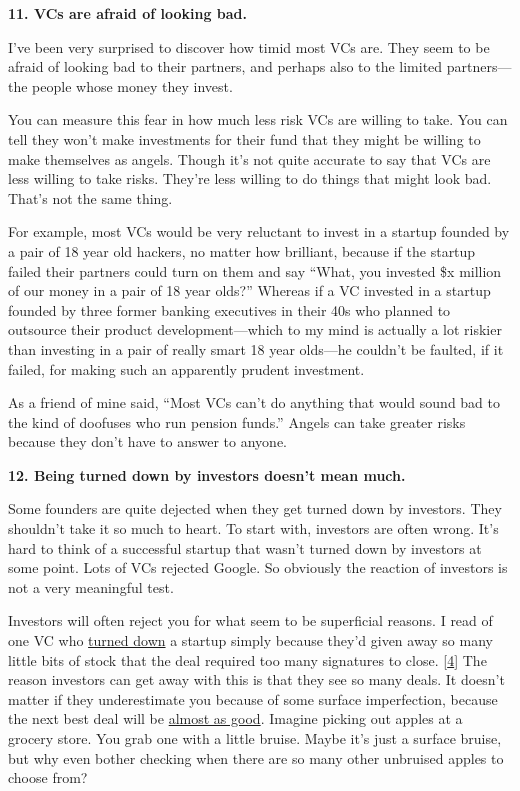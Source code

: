 \textbf{11. VCs are afraid of looking bad.}

I've been very surprised to discover how timid most VCs are. They seem
to be afraid of looking bad to their partners, and perhaps also to the
limited partners---the people whose money they invest.

You can measure this fear in how much less risk VCs are willing to take.
You can tell they won't make investments for their fund that they might
be willing to make themselves as angels. Though it's not quite accurate
to say that VCs are less willing to take risks. They're less willing to
do things that might look bad. That's not the same thing.

For example, most VCs would be very reluctant to invest in a startup
founded by a pair of 18 year old hackers, no matter how brilliant,
because if the startup failed their partners could turn on them and say
``What, you invested \$x million of our money in a pair of 18 year
olds?'' Whereas if a VC invested in a startup founded by three former
banking executives in their 40s who planned to outsource their product
development---which to my mind is actually a lot riskier than investing
in a pair of really smart 18 year olds---he couldn't be faulted, if it
failed, for making such an apparently prudent investment.

As a friend of mine said, ``Most VCs can't do anything that would sound
bad to the kind of doofuses who run pension funds.'' Angels can take
greater risks because they don't have to answer to anyone.

\textbf{12. Being turned down by investors doesn't mean much.}

Some founders are quite dejected when they get turned down by investors.
They shouldn't take it so much to heart. To start with, investors are
often wrong. It's hard to think of a successful startup that wasn't
turned down by investors at some point. Lots of VCs rejected Google. So
obviously the reaction of investors is not a very meaningful test.

Investors will often reject you for what seem to be superficial reasons.
I read of one VC who
\href{http://ricksegal.typepad.com/pmv/2007/02/a_fatal_paper_c.html}{turned
down} a startup simply because they'd given away so many little bits of
stock that the deal required too many signatures to close.
{[}\hyperref[f4n]{4}{]} The reason investors can get away with this is
that they see so many deals. It doesn't matter if they underestimate you
because of some surface imperfection, because the next best deal will be
\href{judgement.html}{almost as good}. Imagine picking out apples at a
grocery store. You grab one with a little bruise. Maybe it's just a
surface bruise, but why even bother checking when there are so many
other unbruised apples to choose from?

